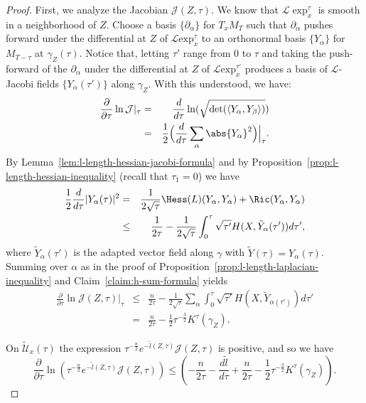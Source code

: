 \begin{proof}
\sketch
 First, we analyze the Jacobian
${\mathcal J}(Z,\tau)$. We know that $\mathcal{L}\exp_x^{\tau}$
is smooth in a neighborhood of $Z$. Choose a basis
$\{\partial_\alpha\}$ for $T_xM_T$ such that $\partial_\alpha$
pushes forward under the differential at $Z$ of ${\mathcal L}\mathrm{exp}_x^\tau$  to an orthonormal basis $\{Y_\alpha\}$ for
$M_{T-\tau}$ at $\gamma_Z(\tau)$. Notice that, letting $\tau'$ range
from $0$ to $\tau$ and taking the push-forward of the
$\partial_\alpha$ under the differential at $Z$ of ${\mathcal L}\mathrm{exp}_x^{\tau'}$ produces a basis of ${\mathcal L}$-Jacobi fields
$\{Y_\alpha(\tau')\}$ along $\gamma_Z$. With this understood, we
have:
\begin{eqnarray*}
\frac{\partial}{\partial \tau}\ln\mathcal{J}|_\tau & = &
\frac{d}{d\tau}\ln(\sqrt{\det(\langle
Y_{\alpha},Y_{\beta}\rangle
)})\\
 & = &
\frac{1}{2}\Bigl(\frac{d}{d\tau}\sum_{\alpha}\abs{Y_{\alpha}}^{2}\Bigr)\Bigl|_{\tau}\Bigr.
.
\end{eqnarray*}
By Lemma~\ref{lem:l-length-hessian-jacobi-formula} and by Proposition~\ref{prop:l-length-hessian-inequality} (recall that
$\tau_1=0$) we have
\begin{eqnarray}\nonumber
\frac{1}{2}\frac{d}{d\tau}|Y_\alpha(\tau)|^2 & = &
\frac{1}{2\sqrt{\tau}}\Hess(L)(Y_\alpha,Y_\alpha) +\Ric(Y_\alpha,Y_\alpha) \\ & \le &
\frac{1}{2\tau}-\frac{1}{2\sqrt{\tau}}\int_0^{\tau}\sqrt{\tau'}H(X,\tilde
Y_\alpha(\tau'))d\tau',\label{basic}\end{eqnarray} where $\tilde
Y_\alpha(\tau')$ is the adapted vector field along $\gamma$ with
$\tilde Y(\tau)=Y_\alpha(\tau)$. Summing over $\alpha$ as in the
proof of Proposition~\ref{prop:l-length-laplacian-inequality} and Claim~\ref{claim:h-sum-formula} yields
\begin{eqnarray}
\frac{\partial}{\partial\tau}\ln\mathcal{J}(Z,\tau)|_{\tau} &
\le & \frac{n}{2\tau} -
\frac{1}{2\sqrt{\tau}}\sum_{\alpha}\int_{0}^{\tau}\sqrt{\tau'}H(X,\tilde
Y_{\alpha(\tau')})d\tau' \nonumber
\\&=  & \frac{n}{2\tau} - \frac{1}{2}\tau^{-\frac{3}{2}}K^\tau(\gamma_Z).\label{Jinequ}
\end{eqnarray}

On $\widetilde {\mathcal U}_x(\tau)$ the expression
$\tau^{-\frac{n}{2}}e^{-\widetilde l(Z,\tau)}{\mathcal J}(Z,\tau)$
is positive, and so we have
$$\frac{\partial}{\partial\tau}\ln\left(\tau^{-\frac{n}{2}}e^{-\widetilde
l(Z,\tau)}{\mathcal J}(Z,\tau)\right)\le
\left(-\frac{n}{2\tau}-\frac{d\widetilde l}{d
\tau}+\frac{n}{2\tau}-\frac{1}{2}\tau^{-\frac{3}{2}}K^\tau(\gamma_Z)\right).$$



\end{proof}
